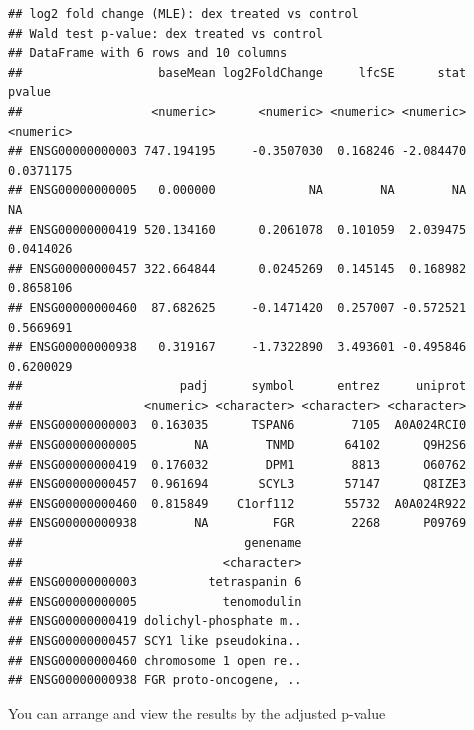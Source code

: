\documentclass[
]{article}
\newenvironment{Shaded}{\begin{snugshade}}{\end{snugshade}}
\newcommand{\FunctionTok}[1]{\textcolor[rgb]{0.00,0.00,0.00}{#1}}
\newcommand{\NormalTok}[1]{#1}
\newcommand{\OtherTok}[1]{\textcolor[rgb]{0.56,0.35,0.01}{#1}}
\newcommand{\SpecialCharTok}[1]{\textcolor[rgb]{0.00,0.00,0.00}{#1}}
\begin{document}
\begin{verbatim}
## log2 fold change (MLE): dex treated vs control 
## Wald test p-value: dex treated vs control 
## DataFrame with 6 rows and 10 columns
##                   baseMean log2FoldChange     lfcSE      stat    pvalue
##                  <numeric>      <numeric> <numeric> <numeric> <numeric>
## ENSG00000000003 747.194195     -0.3507030  0.168246 -2.084470 0.0371175
## ENSG00000000005   0.000000             NA        NA        NA        NA
## ENSG00000000419 520.134160      0.2061078  0.101059  2.039475 0.0414026
## ENSG00000000457 322.664844      0.0245269  0.145145  0.168982 0.8658106
## ENSG00000000460  87.682625     -0.1471420  0.257007 -0.572521 0.5669691
## ENSG00000000938   0.319167     -1.7322890  3.493601 -0.495846 0.6200029
##                      padj      symbol      entrez     uniprot
##                 <numeric> <character> <character> <character>
## ENSG00000000003  0.163035      TSPAN6        7105  A0A024RCI0
## ENSG00000000005        NA        TNMD       64102      Q9H2S6
## ENSG00000000419  0.176032        DPM1        8813      O60762
## ENSG00000000457  0.961694       SCYL3       57147      Q8IZE3
## ENSG00000000460  0.815849    C1orf112       55732  A0A024R922
## ENSG00000000938        NA         FGR        2268      P09769
##                               genename
##                            <character>
## ENSG00000000003          tetraspanin 6
## ENSG00000000005            tenomodulin
## ENSG00000000419 dolichyl-phosphate m..
## ENSG00000000457 SCY1 like pseudokina..
## ENSG00000000460 chromosome 1 open re..
## ENSG00000000938 FGR proto-oncogene, ..
\end{verbatim}

You can arrange and view the results by the adjusted p-value

\begin{Shaded}
\end{Shaded}
\end{document}
